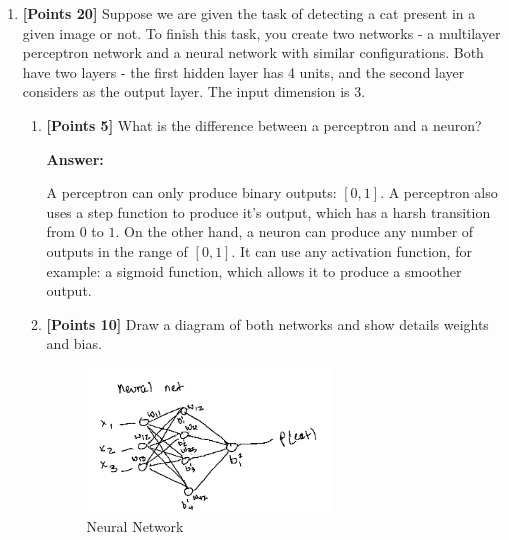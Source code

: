 \documentclass[12pt]{article}
\begin{document}
\begin{enumerate}
          \newpage
    \item \textbf{[Points 20]} Suppose we are given the task of detecting a cat
          present in a given image or not. To finish this task, you create two
          networks - a multilayer perceptron network and a neural network with
          similar configurations. Both have two layers - the first hidden layer
          has 4 units, and the second layer considers as the output layer. The
          input dimension is 3.

          \begin{enumerate}
              \item \textbf{[Points 5]} What is the difference between a
                    perceptron and a neuron?

                    \textbf{Answer:}

                    A perceptron can only produce binary outputs: $[0, 1]$. A
                    perceptron also uses a step function to produce it's output,
                    which has a harsh transition from $0$ to $1$. On the other
                    hand, a neuron can produce any number of outputs in the
                    range of $[0, 1]$. It can use any activation function, for
                    example: a sigmoid function, which allows it to produce a
                    smoother output.

              \item \textbf{[Points 10]} Draw a diagram of both networks and
                    show details weights and bias.

                    \begin{figure}[h]
                        \centering
                        \includegraphics[width=0.65\textwidth]{assets/test1/neuralnet.png}
                        \caption{Neural Network}
                    \end{figure}


\end{enumerate}
\end{enumerate}
\end{document}
